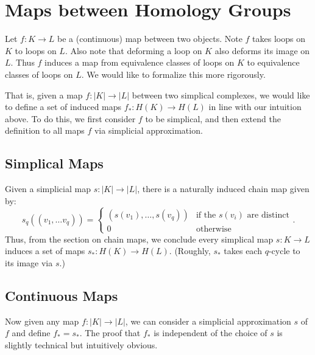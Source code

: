 \section{Maps between Homology Groups}

Let $f: K \to L$ be a (continuous) map between two objects. Note $f$ takes loops on $K$ to loops on $L$. Also note that deforming a loop on $K$ also deforms its image on $L$. Thus $f$ induces a map from equivalence classes of loops on $K$ to equivalence classes of loops on $L$. We would like to formalize this more rigorously.

That is, given a map $f: |K| \to |L|$ between two simplical complexes, we would like to define a set of induced maps $f_{*}: H(K) \to H(L)$ in line with our intuition above. To do this, we first consider $f$ to be simplical, and then extend the definition to all maps $f$ via simplicial approximation.

\subsection{Simplical Maps}
Given a simplicial map $s: |K| \to |L|$, there is a naturally induced chain map given by:
\[
    s_q\left((v_1, \dots v_q)\right) =
    \begin{cases}
        \left(s(v_1), \dots, s(v_q)\right) & \text{if the $s(v_i)$ are distinct} \\
        0 & \text{otherwise}
    \end{cases}.
\]
Thus, from the section on chain maps, we conclude every simplical map $s: K \to L$ induces a set of maps $s_*: H(K) \to H(L)$. (Roughly, $s_*$ takes each $q$-cycle to its image via $s$.)

\subsection{Continuous Maps}
Now given any map $f: |K| \to |L|$, we can consider a simplicial approximation $s$ of $f$ and define $f_* = s_*$. The proof that $f_*$ is independent of the choice of $s$ is slightly technical but intuitively obvious.